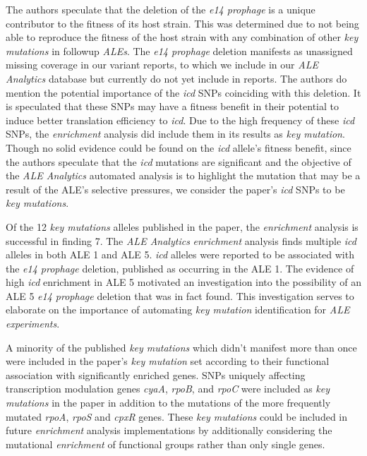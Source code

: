 \documentclass[12pt,final,masters,chapterheads]{ucsd}  %
\begin{document}
The authors speculate that the deletion of the \textit{e14 prophage} is a unique contributor to the fitness of its host strain. This was determined due to not being able to reproduce the fitness of the host strain with any combination of other \textit{key mutations} in followup \textit{ALEs}. The \textit{e14 prophage} deletion manifests as unassigned missing coverage in our variant reports, to which we include in our \textit{ALE Analytics} database but currently do not yet include in reports. The authors do mention the potential importance of the \textit{icd} SNPs coinciding with this deletion. It is speculated that these SNPs may have a fitness benefit in their potential to induce better translation efficiency to \textit{icd}. Due to the high frequency of these \textit{icd} SNPs, the \textit{enrichment} analysis did include them in its results as \textit{key mutation}. Though no solid evidence could be found on the \textit{icd} allele's fitness benefit, since the authors speculate that the \textit{icd} mutations are significant and the objective of the \textit{ALE Analytics} automated analysis is to highlight the mutation that may be a result of the ALE's selective pressures, we consider the paper's \textit{icd} SNPs to be \textit{key mutations}.

Of the 12 \textit{key mutations} alleles published in the paper, the \textit{enrichment} analysis is successful in finding 7. The \textit{ALE Analytics} \textit{enrichment} analysis finds multiple \textit{icd} alleles in both ALE 1 and ALE 5. \textit{icd} alleles were reported to be associated with the \textit{e14 prophage } deletion, published as occurring in the ALE 1. The evidence of high \textit{icd} enrichment in ALE 5 motivated an investigation into the possibility of an ALE 5 \textit{e14 prophage} deletion that was in fact found. This investigation serves to elaborate on the importance of automating \textit{key mutation} identification for \textit{ALE experiments}.

A minority of the published \textit{key mutations} which didn't manifest more than once were included in the paper's \textit{key mutation} set according to their functional association with significantly enriched genes. SNPs uniquely affecting transcription modulation genes \textit{cyaA}, \textit{rpoB}, and \textit{rpoC} were included as \textit{key mutations} in the paper in addition to the mutations of the more frequently mutated \textit{rpoA}, \textit{rpoS} and \textit{cpxR} genes. These \textit{key mutations} could be included in future \textit{enrichment} analysis implementations by additionally considering the mutational \textit{enrichment} of functional groups rather than only single genes.
\end{document}
